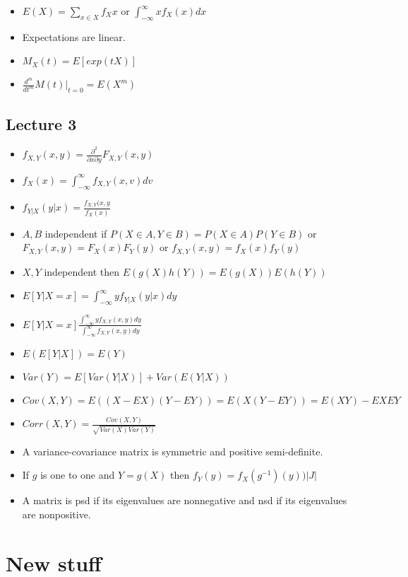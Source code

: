 \documentclass[11pt]{article} %
\begin{document}
\begin{itemize}
\item $E(X) = \sum_{x \in X}f_{X}x \text{ or } \int_{-\infty}^{\infty} xf_X(x)dx$
\item Expectations are linear.
\item $M_{X}(t) = E[exp(tX)]$
\item $\frac{d^{m}}{dt^m}M(t)|_{t=0} = E(X^m)$
\end{itemize}

\subsection{Lecture 3}
\begin{itemize}
\item $f_{X,Y}(x,y) = \frac{\partial^2}{\partial x \partial y}F_{X,Y}(x,y)$
\item $f_{X}(x) = \int_{-\infty}^{\infty} f_{X,Y}(x,v)dv$
\item $f_{Y|X}(y|x) = \frac{f_{X,Y}(x,y}{f_{X}(x)}$
\item $A,B$ independent if $P(X\in A,Y \in B) = P(X\in A)P(Y \in B)$ or $F_{X,Y}(x,y) = F_{X}(x) F_Y(y)$ or $f_{X,Y}(x,y) = f_X(x) f_Y(y)$
\item $X,Y$ independent then $E(g(X)h(Y))=E(g(X))E(h(Y))$
\item $E[Y|X=x] =\int_{-\infty}^{\infty} yf_{Y|X}(y|x)dy$
\item $E[Y|X=x] \frac{\int_{-\infty}^{\infty}yf_{X,Y}(x,y)dy}{\int_{-\infty}^{\infty}f_{X,Y}(x,y)dy}$
\item $E(E[Y|X]) = E(Y)$
\item $Var(Y) = E[Var(Y|X)] + Var(E(Y|X))$
\item $Cov(X,Y) = E((X-EX)(Y-EY)) = E(X(Y-EY)) = E(XY) - EXEY$
\item $Corr(X,Y) = \frac{Cov(X,Y)}{\sqrt{Var(X)Var(Y)}}$
\item A variance-covariance matrix is symmetric and positive semi-definite.
\item If $g$ is one to one and $Y=g(X) $ then $f_Y(y) = f_X(g^{-1})(y))|J|$
\item A matrix is psd if its eigenvalues are nonnegative and nsd if its eigenvalues are nonpositive.
\end{itemize}

\section{New stuff}
\end{document}
